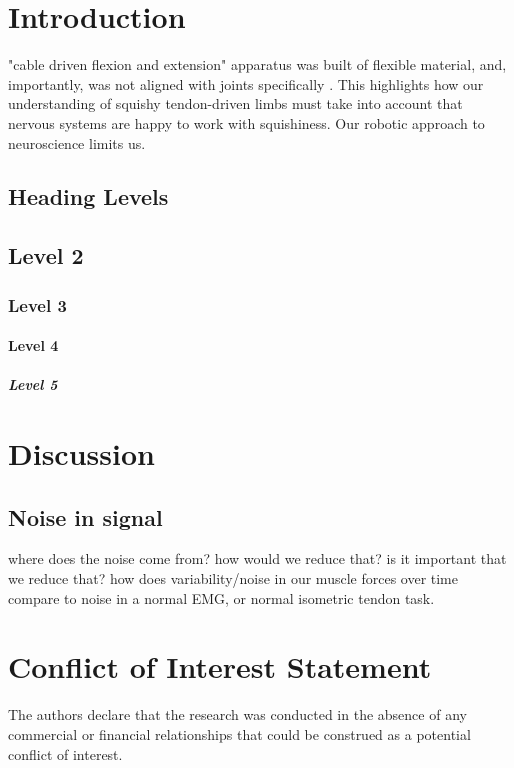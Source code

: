 \documentclass[utf8]{frontiersSCNS} %
\begin{document}
\section{Introduction}

"cable driven flexion and extension" apparatus was built of flexible material, and, importantly, was not aligned with joints specifically \cite{Yi:2018et}. This highlights how our understanding of squishy tendon-driven limbs must take into account that nervous systems are happy to work with squishiness. Our robotic approach to neuroscience limits us.


\subsection{Heading Levels}


\subsection{Level 2}
\subsubsection{Level 3}
\paragraph{Level 4}
\subparagraph{Level 5}


\section{Discussion}
\subsection{Noise in signal}

where does the noise come from?
how would we reduce that?
is it important that we reduce that? how does variability/noise in our muscle forces over time compare to noise in a normal EMG, or normal isometric tendon task.

\section*{Conflict of Interest Statement}
The authors declare that the research was conducted in the absence of any commercial or financial relationships that could be construed as a potential conflict of interest.
\end{document}
